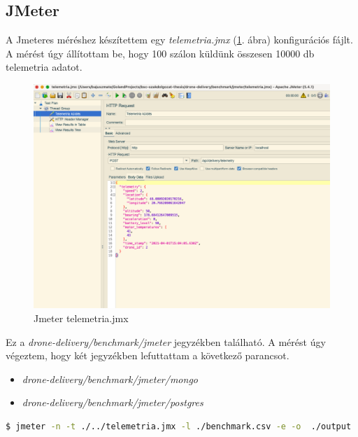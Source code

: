 \subsection{JMeter}
A Jmeteres méréshez készítettem egy \textit{telemetria.jmx} (\ref{fig:jmeter-meres}. ábra) konfigurációs fájlt.
A mérést úgy állítottam be, hogy 100 szálon küldünk összesen 10000 db telemetria adatot.
\begin{figure}[h]
    \centering
    \includegraphics[scale=0.3]{images/jmeter-meres}
    \caption{Jmeter telemetria.jmx}
    \label{fig:jmeter-meres}
\end{figure}
Ez a \textit{drone-delivery/benchmark/jmeter} jegyzékben található.
A mérést úgy végeztem, hogy két jegyzékben lefuttattam a következő parancsot.
\begin{itemize}
    \item \textit{drone-delivery/benchmark/jmeter/mongo}
    \item \textit{drone-delivery/benchmark/jmeter/postgres}
\end{itemize}
\begin{lstlisting}[language=bash]
  $ jmeter -n -t ./../telemetria.jmx -l ./benchmark.csv -e -o  ./output
\end{lstlisting}

